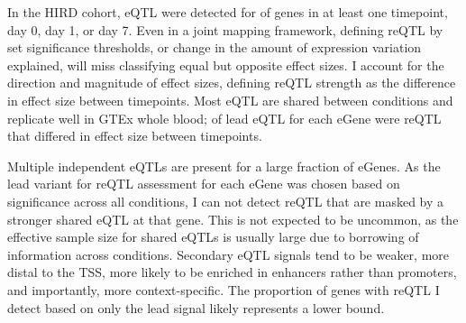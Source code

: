 In the \gls{HIRD} cohort, 
\gls{eQTL} were detected for  of genes in at least one timepoint, day 0, day 1, or day 7.
Even in a joint mapping framework, defining \gls{reQTL} by set significance thresholds, or change in the amount of expression variation explained, will miss classifying equal but opposite effect sizes.
I account for the direction and magnitude of effect sizes, defining reQTL strength as the difference in effect size between timepoints.
Most \gls{eQTL} are shared between conditions and replicate well in GTEx whole blood;
 of lead \gls{eQTL} for each eGene were \gls{reQTL} that differed in effect size between timepoints.

Multiple independent eQTLs are present for a large fraction of eGenes\autocite{zeng2019ComprehensiveMultipleEQTL}.
As the lead variant for reQTL assessment for each eGene was chosen based on significance across all conditions, I can not detect reQTL that are masked by a stronger shared eQTL at that gene.
This is not expected to be uncommon, as the effective sample size for shared eQTLs is usually large due to borrowing of information across conditions.
Secondary \gls{eQTL} signals tend to be weaker, more distal to the TSS, more likely to be enriched in enhancers rather than promoters, and importantly, more context-specific\autocite{dobbyn2018LandscapeConditionalEQTL}.
The proportion of genes with reQTL I detect based on only the lead signal likely represents a lower bound.

